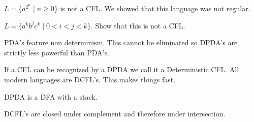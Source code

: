 \documentclass[../598comp.tex]{subfiles}
\begin{document}
\begin{example}
  $L = \{a^{2^n} \mid n \geq 0\}$ is not a CFL. We showed that this language was
  not regular.
\end{example}

\begin{exercise}
  $L = \{a^kb^jc^k \mid 0 < i < j < k\}$. Show that this is not a CFL.
\end{exercise}

\begin{definition}[DPDA]
  PDA's feature non determinism. This cannot be eliminated so DPDA's are strictly
  less powerful than PDA's.

  If a CFL can be recognized by a DPDA we call it a Deterministic CFL. All modern
  languages are DCFL's. This makes things fast.

  DPDA is a DFA with a stack.
\end{definition}

\begin{fact}
  DCFL's are closed under complement and therefore under intersection.
\end{fact}
\end{document}
